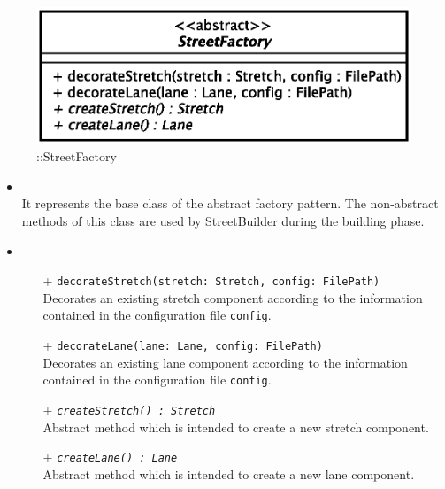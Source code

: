 \begin{figure}[h]
\centering
\includegraphics[scale=0.6,keepaspectratio]{images/solution/street_factory.eps}
\caption{\pReactiveFactory::StreetFactory}
\label{fig:sd-app-street-factory}
\end{figure}
\FloatBarrier
\begin{itemize}
  \item \textbf{\descr} \\
    It represents the base class of the abstract factory pattern. The 
non-abstract methods of this class are used by StreetBuilder during the
building phase.
  \item \textbf{\ops} \\
  \begin{itemize} 
    \item[+] \texttt{decorateStretch(stretch: Stretch, config: FilePath)} \\
Decorates an existing stretch component according to the information contained
in the configuration file \texttt{config}.
    \item[+] \texttt{decorateLane(lane: Lane, config: FilePath)} \\
Decorates an existing lane component according to the information contained in
the configuration file \texttt{config}.
    \item[+] \texttt{\textit{createStretch() : Stretch}} \\
Abstract method which is intended to create a new stretch component.
    \item[+] \texttt{\textit{createLane() : Lane}} \\
Abstract method which is intended to create a new lane component.
  \end{itemize}
\end{itemize}

